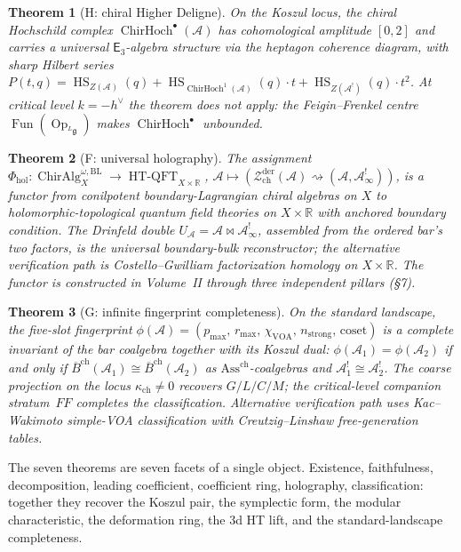 \documentclass[11pt]{article}
\providecommand{\cA}{\mathcal{A}}
\providecommand{\cZ}{\mathcal{Z}}
\providecommand{\bR}{\mathbb{R}}
\providecommand{\fg}{\mathfrak{g}}
\providecommand{\barB}{\overline{B}}
\providecommand{\Ethree}{\mathsf{E}_{3}}
\providecommand{\ChirHoch}{\operatorname{ChirHoch}}
\providecommand{\ChirAlg}{\operatorname{ChirAlg}}
\providecommand{\HTQFT}{\operatorname{HT\text{-}QFT}}
\providecommand{\Phihol}{\Phi_{\mathrm{hol}}}
\providecommand{\kch}{\kappa_{\mathrm{ch}}}
\newtheorem{theorem}{Theorem}[section]
\begin{document}
\begin{theorem}[H: chiral Higher Deligne]
On the Koszul locus, the chiral Hochschild complex
$\ChirHoch^{\bullet}(\cA)$ has cohomological amplitude
$[0,2]$ and carries a universal $\Ethree$-algebra structure via
the heptagon coherence diagram, with sharp Hilbert series
$P(t,q) = \operatorname{HS}_{Z(\cA)}(q)
+ \operatorname{HS}_{\ChirHoch^{1}(\cA)}(q)\cdot t
+ \operatorname{HS}_{Z(\cA^{!})}(q)\cdot t^2$. At critical level
$k=-h^{\vee}$ the theorem does not apply: the Feigin--Frenkel
centre $\operatorname{Fun}(\operatorname{Op}_{{}^L\!\fg})$ makes
$\ChirHoch^{\bullet}$ unbounded.
\end{theorem}

\begin{theorem}[F: universal holography]
The assignment
$\Phihol\colon \ChirAlg^{\omega,\mathrm{BL}}_X
\longrightarrow \HTQFT_{X\times\bR}$,
$\cA\mapsto(\cZ^{\mathrm{der}}_{\mathrm{ch}}(\cA)\rightsquigarrow
(\cA,\cA^{!}_\infty))$,
is a functor from conilpotent boundary-Lagrangian chiral algebras on
$X$ to holomorphic-topological quantum field theories on
$X\times\bR$ with anchored boundary condition. The Drinfeld double
$U_\cA = \cA\bowtie\cA^{!}_\infty$, assembled from the ordered bar's
two factors, is the universal boundary-bulk reconstructor; the
alternative verification path is Costello--Gwilliam factorization
homology on $X\times\bR$. The functor is constructed in Volume~II
through three independent pillars (\S7).
\end{theorem}

\begin{theorem}[G: infinite fingerprint completeness]
On the standard landscape, the five-slot fingerprint
$\phi(\cA) = (p_{\max},\,r_{\max},\,\chi_{\mathrm{VOA}},\,
n_{\mathrm{strong}},\,\mathrm{coset})$ is a complete invariant of
the bar coalgebra together with its Koszul dual:
$\phi(\cA_1)=\phi(\cA_2)$ if and only if
$\barB^{\mathrm{ch}}(\cA_1)\cong\barB^{\mathrm{ch}}(\cA_2)$ as
$\mathrm{Ass}^{\mathrm{ch}}$-coalgebras and
$\cA_1^{!}\cong\cA_2^{!}$. The coarse projection on the locus
$\kch\ne 0$ recovers $G/L/C/M$; the critical-level companion
stratum~$FF$ completes the classification. Alternative verification
path uses Kac--Wakimoto simple-VOA classification with
Creutzig--Linshaw free-generation tables.
\end{theorem}

The seven theorems are seven facets of a single object. Existence,
faithfulness, decomposition, leading coefficient, coefficient ring,
holography, classification: together they recover the Koszul pair,
the symplectic form, the modular characteristic, the deformation
ring, the 3d HT lift, and the standard-landscape completeness.
\end{document}

